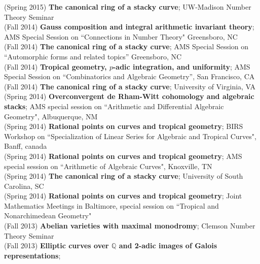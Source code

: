 \documentclass[margin,line]{res}
\begin{document}
\begin{resume}
(Spring 2015) \textbf{The canonical ring of a stacky curve};  
UW-Madison Number Theory Seminar
\vspace{.05cm}\\
(Fall 2014) \textbf{Gauss composition and integral arithmetic invariant theory};  
AMS Special Session on  ``Connections in Number Theory" Greensboro, NC
\vspace{.05cm}\\
(Fall 2014) \textbf{The canonical ring of a stacky curve};
AMS Special Session on ``Automorphic forms and related topics'' Greensboro, NC
\vspace{.05cm}\\
(Fall 2014) \textbf{Tropical geometry, $p$-adic integration, and uniformity};
AMS Special Session on ``Combinatorics and Algebraic Geometry'', San Francisco, CA
\vspace{.05cm}\\
(Fall 2014) \textbf{The canonical ring of a stacky curve};  
University of Virginia, VA
\vspace{.05cm}\\
(Spring 2014) \textbf{Overconvergent de Rham-Witt cohomology and algebraic stacks};  
AMS special session on ``Arithmetic and Differential Algebraic Geometry", Albuquerque, NM
\vspace{.05cm}\\
(Spring 2014) \textbf{Rational points on curves and tropical geometry};  
BIRS Workshop on ``Specialization of Linear Series for Algebraic and Tropical Curves", Banff, canada
\vspace{.05cm}\\
(Spring 2014) \textbf{Rational points on curves and tropical geometry};  
AMS special session on ``Arithmetic of Algebraic Curves", Knoxville, TN
\vspace{.05cm}\\
(Spring 2014) \textbf{The canonical ring of a stacky curve};  
University of South Carolina, SC
\vspace{.05cm}\\
(Spring 2014) \textbf{Rational points on curves and tropical geometry};  
Joint Mathematics Meetings in Baltimore, special session on ``Tropical and Nonarchimedean Geometry"  
\vspace{.05cm}\\
(Fall 2013) \textbf{Abelian varieties with maximal monodromy};  
Clemson Number Theory Seminar 
\vspace{.05cm}\\
(Fall 2013) \textbf{Elliptic curves over $\mathbb{Q}$ and 2-adic images of Galois representations};  

\end{resume}
\end{document}
